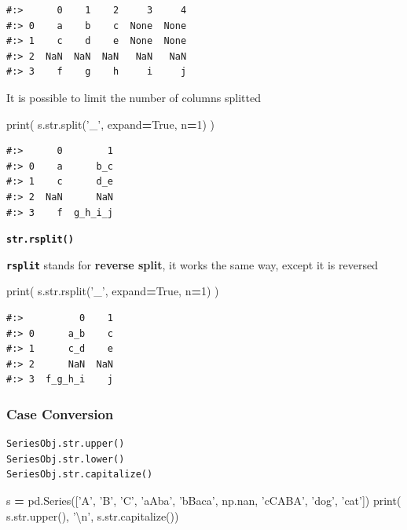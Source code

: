 \documentclass[
]{book}
\newenvironment{Shaded}{\begin{snugshade}}{\end{snugshade}}
\newcommand{\BuiltInTok}[1]{#1}
\newcommand{\CharTok}[1]{\textcolor[rgb]{0.5,0.5,0.5}{#1}}
\newcommand{\DecValTok}[1]{\textcolor[rgb]{0.06,0.06,0.06}{#1}}
\newcommand{\NormalTok}[1]{#1}
\newcommand{\OperatorTok}[1]{\textcolor[rgb]{0.43,0.43,0.43}{\textbf{#1}}}
\newcommand{\StringTok}[1]{\textcolor[rgb]{0.5,0.5,0.5}{#1}}
\newcommand{\VariableTok}[1]{\textcolor[rgb]{0,0,0}{#1}}
\begin{document}
\begin{verbatim}
#:>      0    1    2     3     4
#:> 0    a    b    c  None  None
#:> 1    c    d    e  None  None
#:> 2  NaN  NaN  NaN   NaN   NaN
#:> 3    f    g    h     i     j
\end{verbatim}

It is possible to limit the number of columns splitted

\begin{Shaded}
\begin{Highlighting}[]
\BuiltInTok{print}\NormalTok{( s.}\BuiltInTok{str}\NormalTok{.split(}\StringTok{'_'}\NormalTok{, expand}\OperatorTok{=}\VariableTok{True}\NormalTok{, n}\OperatorTok{=}\DecValTok{1}\NormalTok{) )}
\end{Highlighting}
\end{Shaded}

\begin{verbatim}
#:>      0        1
#:> 0    a      b_c
#:> 1    c      d_e
#:> 2  NaN      NaN
#:> 3    f  g_h_i_j
\end{verbatim}

\textbf{\texttt{str.rsplit()}}

\textbf{\texttt{rsplit}} stands for \textbf{reverse split}, it works the same way, except it is reversed

\begin{Shaded}
\begin{Highlighting}[]
\BuiltInTok{print}\NormalTok{( s.}\BuiltInTok{str}\NormalTok{.rsplit(}\StringTok{'_'}\NormalTok{, expand}\OperatorTok{=}\VariableTok{True}\NormalTok{, n}\OperatorTok{=}\DecValTok{1}\NormalTok{) )}
\end{Highlighting}
\end{Shaded}

\begin{verbatim}
#:>          0    1
#:> 0      a_b    c
#:> 1      c_d    e
#:> 2      NaN  NaN
#:> 3  f_g_h_i    j
\end{verbatim}

\hypertarget{case-conversion}{%
\subsubsection{Case Conversion}\label{case-conversion}}

\begin{verbatim}
SeriesObj.str.upper()
SeriesObj.str.lower()
SeriesObj.str.capitalize()
\end{verbatim}

\begin{Shaded}
\begin{Highlighting}[]
\NormalTok{s }\OperatorTok{=}\NormalTok{ pd.Series([}\StringTok{'A'}\NormalTok{, }\StringTok{'B'}\NormalTok{, }\StringTok{'C'}\NormalTok{, }\StringTok{'aAba'}\NormalTok{, }\StringTok{'bBaca'}\NormalTok{, np.nan, }\StringTok{'cCABA'}\NormalTok{, }\StringTok{'dog'}\NormalTok{, }\StringTok{'cat'}\NormalTok{])}
\BuiltInTok{print}\NormalTok{( s.}\BuiltInTok{str}\NormalTok{.upper(), }\StringTok{'}\CharTok{\textbackslash{}n}\StringTok{'}\NormalTok{,}
\NormalTok{       s.}\BuiltInTok{str}\NormalTok{.capitalize())}
\end{Highlighting}
\end{Shaded}
\end{document}
